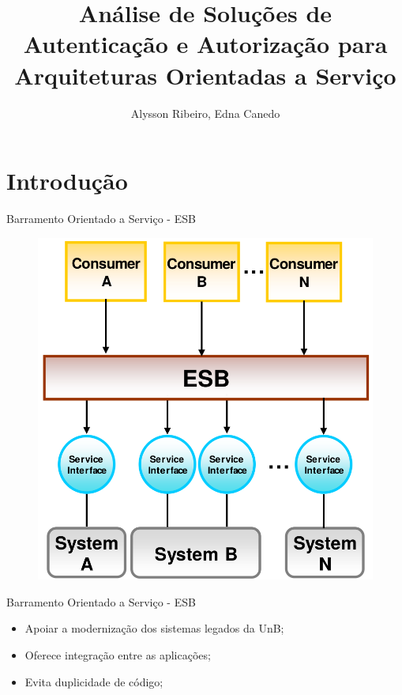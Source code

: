 \documentclass[aspectratio=169, newPxFont]{beamer}
\author{Alysson Ribeiro, Edna Canedo}
\title{Análise de Soluções de Autenticação e Autorização para Arquiteturas Orientadas a Serviço}
\institute{Universidade de Brasília}
\begin{document}
%
%



\begin{frame}[plain]
	\titlepage
\end{frame}

\begin{frame}
	\tableofcontents
\end{frame}

\section{Introdução}
		\begin{frame}{Barramento Orientado a Serviço - ESB }
		\begin{figure}[h!]
		\begin{center}
		\includegraphics[scale = 0.22]{img/ESB.png}
		\label{fun:fig:oauth}
		\end{center}
	\end{figure} 


		\end{frame}

		\begin{frame}{Barramento Orientado a Serviço - ESB }
			\begin{itemize}
				\item Apoiar a modernização dos sistemas legados da UnB;
				\item Oferece integração entre as aplicações;
				\item Evita duplicidade de código;
			\end{itemize}
		\end{frame}
\end{document}
